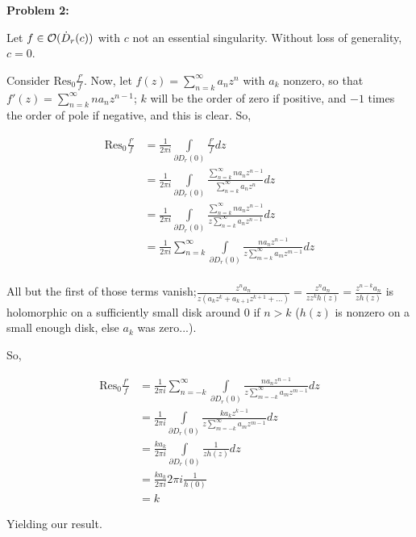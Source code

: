 \documentclass[a4paper,12pt]{article}
\begin{document}
\shunt

{\bf Problem 2:} %

Let $f \in \mathcal{O}(\dot{D}_r(c))$ with $c$ not an essential singularity. Without loss of generality, $c=0$.

Consider $\text{Res}_0 \frac{f'}{f}$.  Now, let $f(z) = \sum\limits_{n=k}^\infty a_nz^n$ with $a_k$ nonzero, so that $f'(z) = \sum\limits_{n=k}^\infty na_nz^{n-1}$; $k$ will be the order of zero if positive, and $-1$ times the order of pole if negative, and this is clear. So,

\begin{align*} %
\text{Res}_0 \frac{f'}{f}  &= \frac{1}{2\pi i} \int\limits_{ \partial D_r(0)} \frac{f'}{f} dz\\
&= \frac{1}{2\pi i} \int\limits_{ \partial D_r(0)} \frac{\sum\limits_{n=k}^\infty na_nz^{n-1}}{\sum\limits_{n=k}^\infty a_nz^n} dz\\
&= \frac{1}{2\pi i} \int\limits_{ \partial D_r(0)} \frac{\sum\limits_{n=k}^\infty na_nz^{n-1}}{z\sum\limits_{n=k}^\infty a_{n}z^{n-1}} dz\\
&= \frac{1}{2\pi i} \sum\limits_{n=k}^\infty \int\limits_{ \partial D_r(0)} \frac{na_nz^{n-1}}{z\sum\limits_{m=k}^\infty a_{m}z^{m-1}} dz\\
\end{align*} 

All but the first of those terms vanish;$\frac{z^na_n}{z(a_{k}z^{k}+ a_{k+1}z^{k+1}+ \ldots )} = \frac{z^na_n}{zz^{k}h(z)} = \frac{z^{n-k}a_n}{zh(z)}$ is holomorphic on a sufficiently small disk around $0$ if $n > k$ ($h(z)$ is nonzero on a small enough disk, else $a_k$ was zero...).

So, 

\begin{align*}
\text{Res}_0 \frac{f'}{f}  &= \frac{1}{2\pi i} \sum\limits_{n=-k}^\infty \int\limits_{ \partial D_r(0)} \frac{na_nz^{n-1}}{z\sum\limits_{m=-k}^\infty a_{m}z^{m-1}} dz\\
&= \frac{1}{2\pi i} \int\limits_{ \partial D_r(0)} \frac{ka_kz^{k-1}}{z\sum\limits_{m=-k}^\infty a_{m}z^{m-1}} dz\\
&= \frac{ka_k}{2\pi i}  \int\limits_{ \partial D_r(0)} \frac{1}{zh(z)} dz\\
&= \frac{ka_k}{2\pi i}  2 \pi i \frac{1}{h(0)}\\
&= k
\end{align*}

Yielding our result. 
\end{document}
